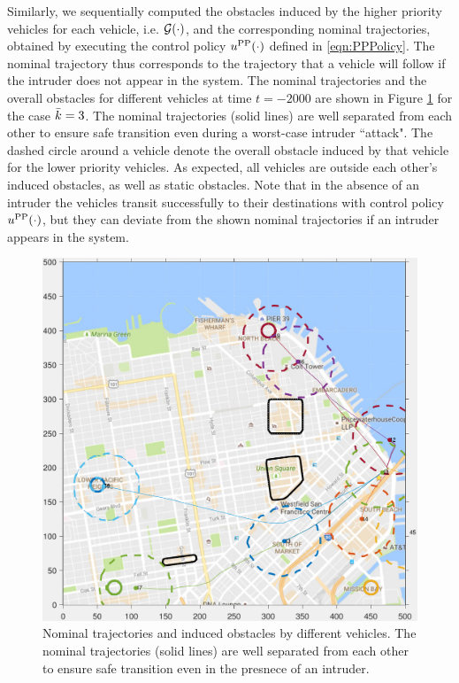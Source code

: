 Similarly, we sequentially computed the obstacles induced by the higher priority vehicles for each vehicle, i.e. $\mathcal{G}(\cdot)$, and the corresponding nominal trajectories, obtained by executing the control policy $u^{\text{PP}}(\cdot)$ defined in \eqref{eqn:PPPolicy}. The nominal trajectory thus corresponds to the trajectory that a vehicle will follow if the intruder does not appear in the system. The nominal trajectories and the overall obstacles for different vehicles at time $t = -2000$  are shown in Figure \ref{fig:trajObsSim} for the case $\bar{k} = 3$. The nominal trajectories (solid lines) are well separated from each other to ensure safe transition even during a worst-case intruder ``attack". The dashed circle around a vehicle denote the overall obstacle induced by that vehicle for the lower priority vehicles. As expected, all vehicles are outside each other's induced obstacles, as well as static obstacles. %
Note that in the absence of an intruder the vehicles transit successfully to their destinations with control policy $u^{\text{PP}}(\cdot)$, but they can deviate from the shown nominal trajectories if an intruder appears in the system.
\begin{figure}[H]
  \centering
  \includegraphics[width=\columnwidth]{"figs/nomTraj"}
  \caption{Nominal trajectories and induced obstacles by different vehicles. The nominal trajectories (solid lines) are well separated from each other to ensure safe transition even in the presnece of an intruder.}
  \label{fig:trajObsSim}
\end{figure}

